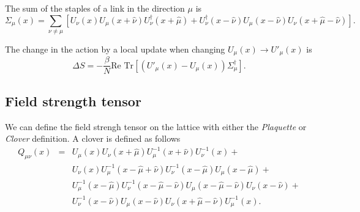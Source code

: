 \documentclass[12pt,a4paper]{article}
\begin{document}
The sum of the staples of a link in the direction $\mu$ is
\begin{equation}
	\label{eq:staples}
	\Sigma_{\mu}(x) = \sum_{\nu \neq \mu} \left[ U_{\nu}(x)U_{\mu}(x+\hat{\nu})U_{\nu}^{\dagger}(x+\hat{\mu}) + U_{\nu}^{\dagger}(x-\hat{\nu})U_{\mu}(x-\hat{\nu})U_{\nu}(x+\hat{\mu}-\hat{\nu})\right].
\end{equation}


The change in the action  by a local update when changing $U_{\mu}(x) \to U'_{\mu}(x)$ is
\begin{equation}
	\label{eq:DS}
	\Delta S = -\frac{\beta}{N} \text{Re } \text{Tr} \left[ \left( U'_{\mu}(x) - U_{\mu}(x) \right)\Sigma_{\mu}^{\dagger}\right].
\end{equation}

\subsection{Field strength tensor}

We can define the field strengh tensor on the lattice with either the \emph{Plaquette} or \emph{Clover} definition. A clover is defined as follows
\begin{eqnarray}
    Q_{\mu\nu}(x) & = & U_{\mu}(x)U_{\nu}(x+\hat{\mu})U_{\mu}^{-1}(x+\hat{\nu})U_{\nu}^{-1}(x)  +  \nonumber\\
    & & U_{\nu}(x)U_{\mu}^{-1}(x-\hat{\mu}+\hat{\nu})U_{\nu}^{-1}(x-\hat{\mu})U_{\mu}(x-\hat{\mu})  + \nonumber\\ 
    & & U_{\mu}^{-1}(x-\hat{\mu})U_{\nu}^{-1}(x-\hat{\mu}-\hat{\nu})U_{\mu}(x-\hat{\mu}-\hat{\nu})U_{\nu}(x-\hat{\nu})+\nonumber\\
    &  & U_{\nu}^{-1}(x-\hat{\nu}) U_{\mu}(x-\hat{\nu})U_{\nu}(x+\hat{\mu}-\hat{\nu})U_{\mu}^{-1}(x).
\end{eqnarray}
\end{document}
